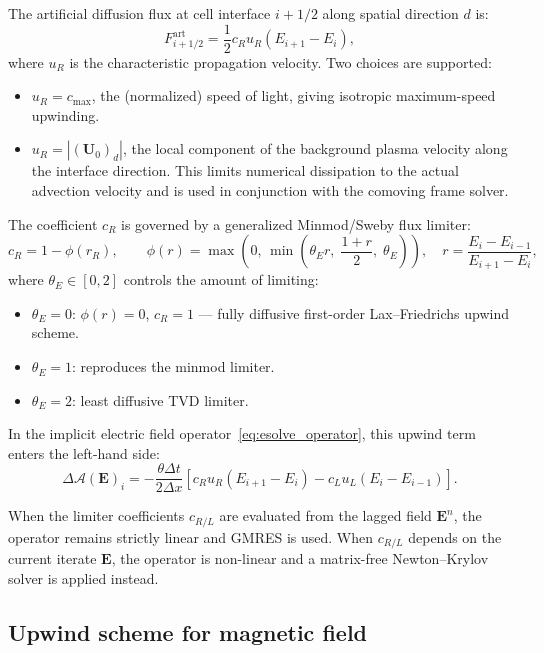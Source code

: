 \documentclass[a4paper, 11pt]{article}
\begin{document}
The artificial diffusion flux at cell interface $i+1/2$ along spatial direction $d$ is:
\begin{equation}
F_{i+1/2}^{\text{art}} = \frac{1}{2} c_R u_R (E_{i+1} - E_i),
\end{equation}
where $u_R$ is the characteristic propagation velocity. Two choices are supported:
\begin{itemize}
  \item $u_R = c_{\max}$, the (normalized) speed of light, giving isotropic maximum-speed upwinding.
  \item $u_R = |(\mathbf{U}_0)_d|$, the local component of the background plasma velocity along the interface direction. This limits numerical dissipation to the actual advection velocity and is used in conjunction with the comoving frame solver.
\end{itemize}
The coefficient $c_R$ is governed by a generalized Minmod/Sweby flux limiter:
\begin{equation}
c_R = 1 - \phi(r_R), \qquad \phi(r) = \max\left(0,\, \min\left(\theta_E r,\; \frac{1+r}{2},\; \theta_E\right)\right), \quad r = \frac{E_i - E_{i-1}}{E_{i+1} - E_i},
\end{equation}
where $\theta_E \in [0, 2]$ controls the amount of limiting:
\begin{itemize}
  \item $\theta_E = 0$: $\phi(r) = 0$, $c_R = 1$ --- fully diffusive first-order Lax--Friedrichs upwind scheme.
  \item $\theta_E = 1$: reproduces the minmod limiter.
  \item $\theta_E = 2$: least diffusive TVD limiter.
\end{itemize}

In the implicit electric field operator~\eqref{eq:esolve_operator}, this upwind term enters the left-hand side:
\begin{equation}
\Delta \mathcal{A}(\mathbf{E})_i = -\frac{\theta \Delta t}{2\Delta x} \left[ c_R u_R (E_{i+1} - E_i) - c_L u_L (E_i - E_{i-1}) \right].
\end{equation}

When the limiter coefficients $c_{R/L}$ are evaluated from the lagged field $\mathbf{E}^n$, the operator remains strictly linear and GMRES is used. When $c_{R/L}$ depends on the current iterate $\mathbf{E}$, the operator is non-linear and a matrix-free Newton--Krylov solver is applied instead.

\subsection{Upwind scheme for magnetic field}
\label{sec:upwind_B}
\end{document}
